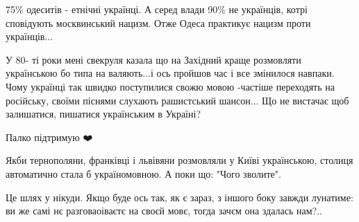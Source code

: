 \begin{itemize}
\begin{itemize}
 

75\% одеситів - етнічні українці. А серед влади 90\% не українців, котрі
сповідують москвинський нацизм. Отже Одеса практикує нацизм проти українців...

\end{itemize}

 

У 80- ті роки мені свекруля казала що на Західний краще розмовляти українською
бо типа на валяють...і ось пройшов час і все змінилося навпаки. Чому українці
так швидко поступилися свожю мовою -частіше переходять на російську, своїми
піснями слухають рашистський шансон... Що не вистачає щоб залишатися, пишатися
українським в Україні?


 
Палко підтримую ❤️

 

Якби тернополяни, франківці і львівяни розмовляли у Київі українською, столиця
автоматично стала б україномовною. А поки що: "Чого зволите".

\begin{itemize}
 

Це шлях у нікуди. Якщо буде ось так, як є зараз, з іншого боку завжди лунатиме:
ви же самі нє разговаоіваєтє на своєй мовє, тогда зачєм она здалась нам?..



\end{itemize}
\end{itemize}
